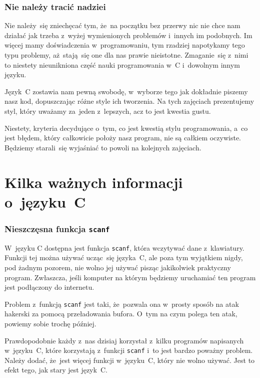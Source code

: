 \documentclass[10pt,t]{beamer}
\begin{document}
\begin{frame}
  \frametitle{Nie należy tracić nadziei}


  Nie należy~się zniechęcać tym, że~na początku bez przerwy nic nie chce
  nam działać jak trzeba z~wyżej wymienionych problemów i~innych im
  podobnych. Im więcej mamy doświadczenia w~programowaniu, tym rzadziej
  napotykamy tego typu problemy, aż~stają~się one dla nas prawie nieistotne.
  Zmaganie~się z~nimi to niestety nieunikniona część nauki programowania
  w~C i~dowolnym innym języku.

  Język~C zostawia nam pewną swobodę, w~wyborze tego jak dokładnie piszemy
  nasz kod, dopuszczając różne \alert{style} ich tworzenia. Na tych
  zajęciach prezentujemy styl, który uważamy za~jeden z~lepszych, acz to
  jest kwestia gustu.

  Niestety, kryteria decydujące o~tym, co jest kwestią stylu programowania,
  a~co jest błędem, który całkowicie położy nasz program, nie są całkiem
  oczywiste. Będziemy starali~się wyjaśniać to powoli na kolejnych zajęciach.

\end{frame}









\section{Kilka ważnych informacji o~języku~C}


\begin{frame}
  \frametitle{Nieszczęsna funkcja \texttt{scanf}}


  W~języku C dostępna jest funkcja \texttt{scanf}, która wczytywać dane
  z~klawiatury. Funkcji tej można używać ucząc~się języka~C, ale poza
  tym wyjątkiem \alert{nigdy}, \alert{pod żadnym pozorem}, \alert{nie wolno}
  jej używać pisząc jakikolwiek praktyczny program. Zwłaszcza, jeśli komputer
  na którym będziemy uruchamiać ten program jest podłączony do internetu.

  Problem z~funkcją \texttt{scanf} jest taki, że~pozwala ona w~prosty sposób
  na atak hakerski za pomocą przeładowania bufora. O~tym na czym polega
  ten atak, powiemy sobie trochę później.

  Prawdopodobnie każdy z~nas dzisiaj korzystał z~kilku programów napisanych
  w~języku~C, które korzystają z~funkcji \texttt{scanf} i~to jest bardzo
  poważny \alert{problem}. Należy dodać, że~jest \alert{więcej} funkcji
  w~języku~C, który \alert{nie wolno} używać. Jest to efekt tego, jak stary
  jest język~C.

\end{frame}
\end{document}
